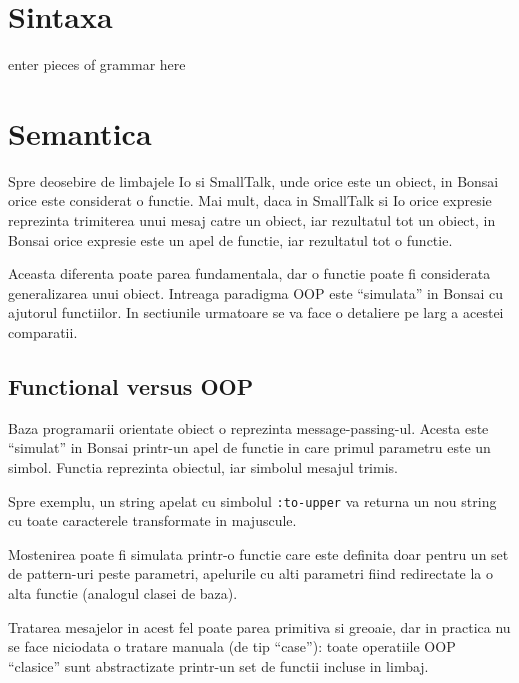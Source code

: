 \documentclass[12pt,a4paper]{memoir}
\begin{document}
\chapter{Sintaxa}

enter pieces of grammar here

\chapter{Semantica}

Spre deosebire de limbajele Io\cite{io} si SmallTalk\cite{smalltalk}, unde orice este un obiect, in Bonsai orice este considerat o functie. Mai mult, daca in SmallTalk si Io orice expresie reprezinta trimiterea unui mesaj catre un obiect, iar rezultatul tot un obiect, in Bonsai orice expresie este un apel de functie, iar rezultatul tot o functie. 

Aceasta diferenta poate parea fundamentala, dar o functie poate fi considerata generalizarea unui obiect. Intreaga paradigma OOP este ``simulata'' in Bonsai cu ajutorul functiilor. In sectiunile urmatoare se va face o detaliere pe larg a acestei comparatii. 

\section{Functional versus OOP}

Baza programarii orientate obiect o reprezinta message-passing-ul. Acesta este ``simulat'' in Bonsai printr-un apel de functie in care primul parametru este un simbol. Functia reprezinta obiectul, iar simbolul mesajul trimis. 

Spre exemplu, un string apelat cu simbolul \texttt{:to-upper} va returna un nou string cu toate caracterele transformate in majuscule. 

Mostenirea poate fi simulata printr-o functie care este definita doar pentru un set de pattern-uri peste parametri, apelurile cu alti parametri fiind redirectate la o alta functie (analogul clasei de baza).

Tratarea mesajelor in acest fel poate parea primitiva si greoaie, dar in practica nu se face niciodata o tratare manuala (de tip ``case''): toate operatiile OOP ``clasice'' sunt abstractizate printr-un set de functii incluse in limbaj.

{}

\end{document}

